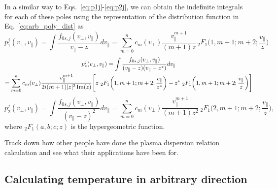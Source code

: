 In a similar way to Eqs.~\ref{eq:p1j}-\ref{eq:p2j}, we can obtain the indefinite integrals for each of these poles using the representation of the distribution function in Eq.~\ref{eq:arb_poly_dist} as
\begin{equation}
	p_1^j(v_\perp,v_\parallel) = \int \frac{f_{0s,j}(v_\perp, v_\parallel)}{v_\parallel-z} dv_\parallel = 
	\sum_{m=0}^n c_m(v_\perp) \frac{v_\parallel^{m+1}}{(m+1)z} \ _2F_1\bigg(1, m+1; m+2; \frac{v_\parallel}{z}\bigg)
	\label{eq:p1j_arb_poly}
\end{equation}
\begin{multline}
	p_*^j(v_\perp,v_\parallel) = \int \frac{f_{0s,j}(v_\perp, v_\parallel)}{(v_\parallel-z)(v_\parallel-z^*)} dv_\parallel \\
	= \sum_{m=0}^n c_m(v_\perp)
	\frac{v_\parallel^{m+1}}{2 i (m+1) |z|^2 \operatorname{Im}(z)} 
	\Bigg[z \ _2F_1\bigg(1, m+1; m+2; \frac{v_\parallel}{z^*}  \bigg)  - z^* \ _2F_1\bigg(1, m+1; m+2; \frac{v_\parallel}{z}  \bigg)\Bigg]
	\label{eq:pstarj_arb_poly}
\end{multline}
\begin{equation}
	p_2^j(v_\perp,v_\parallel) = \int \frac{f_{0s,j}(v_\perp, v_\parallel)}{(v_\parallel-z)^2} dv_\parallel = 
	\sum_{m=0}^n c_m(v_\perp) \frac{v_\parallel^{m+1}}{(m+1)z^2} \ _2F_1\bigg(2, m+1; m+2; \frac{v_\parallel}{z}\bigg),
	\label{eq:p2j_arb_poly}
\end{equation}
where $_2F_1(a, b; c; z)$ is the hypergeometric function. %

Track down how other people have done the plasma dispersion relation calculation and see what their applications have been for.



\subsection{Calculating temperature in arbitrary direction}
\label{s:equiv-temp-known}

